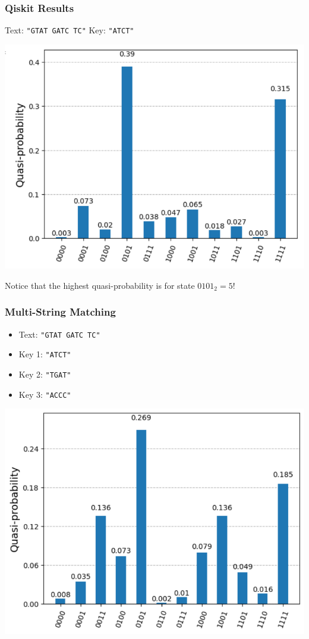 \documentclass[
	11pt, %
]{beamer}
\begin{document}
\begin{frame}
    \frametitle{Qiskit Results}
    Text: \texttt{"GTAT GATC TC"}
    Key: \texttt{"ATCT"}

    \begin{center}
        \includegraphics[scale=0.5]{aer_search.png}
    \end{center}
    Notice that the highest quasi-probability is for state $0101_2 = 5$! 
\end{frame}


\begin{frame}
    \frametitle{Multi-String Matching}
    \begin{itemize}
        \item Text: \texttt{"GTAT GATC TC"}
        \item Key 1: \texttt{"ATCT"}
        \item Key 2: \texttt{"TGAT"}
        \item Key 3: \texttt{"ACCC"}
    \end{itemize}

    \begin{center}
        \includegraphics[scale=0.5]{aer_multi_string_match.png}
    \end{center}
\end{frame}
\end{document}
